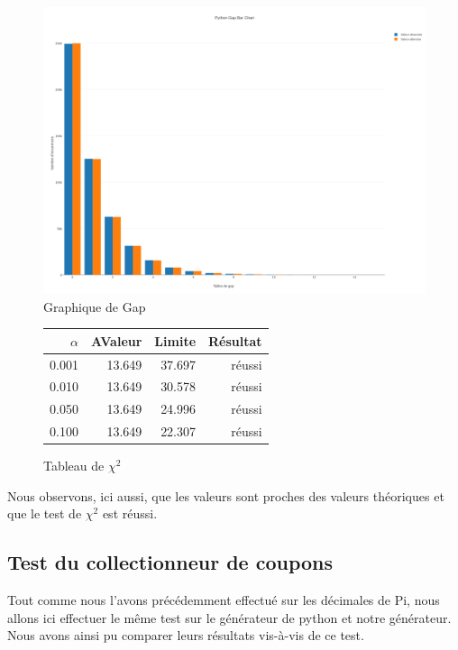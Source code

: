 \documentclass[10pt,a4paper]{article}
\begin{document}
\begin{figure}[h]
\centering
\includegraphics[scale=0.20]{../chart_images/python_gap_bar_chart.png}
\caption{Graphique de Gap}
\end{figure}

\begin{figure}[h]
	\centering
	\begin{tabular}{|r|r|r|r|}
		\hline
		$\alpha$ & AValeur & Limite & Résultat\\
		\hline
		0.001 & 13.649 & 37.697 & réussi\\
		0.010 & 13.649 & 30.578 & réussi\\
		0.050 & 13.649 & 24.996 & réussi\\
		0.100 & 13.649 & 22.307 & réussi\\
		\hline
	\end{tabular}
	\caption{Tableau de $\chi^2$}
\end{figure}


\newpage

Nous observons, ici aussi, que les valeurs sont proches des valeurs théoriques et que le test de $\chi^2$  est réussi.

\newpage

\subsection{Test du collectionneur de coupons}

Tout comme nous l'avons précédemment effectué sur les décimales de Pi, nous allons ici effectuer le même test sur le générateur de python et notre générateur. Nous avons ainsi pu comparer leurs résultats vis-à-vis de ce test.\\
\end{document}
